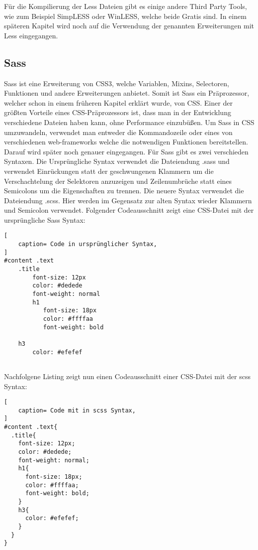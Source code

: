 Für die Kompilierung der Less Dateien gibt es einige andere Third Party Tools, wie zum Beispiel SimpLESS oder WinLESS, welche beide Gratis sind.\newline
In einem späteren Kapitel wird noch auf die Verwendung der genannten Erweiterungen mit Less eingegangen.
\newpage
\subsection{Sass}
Sass ist eine Erweiterung von CSS3, welche Variablen, Mixins, Selectoren, Funktionen und andere Erweiterungen anbietet. Somit ist Sass ein Präprozessor, welcher schon in einem früheren Kapitel erklärt wurde, von CSS.\newline
Einer der größten Vorteile eines CSS-Präprozessors ist, dass man in der Entwicklung verschiedene Dateien haben kann, ohne Performance einzubüßen.\newline
Um Sass in CSS umzuwandeln, verwendet man entweder die Kommandozeile oder eines von verschiedenen web-frameworks welche die notwendigen Funktionen bereitstellen. Darauf wird später noch genauer eingegangen.\newline
Für Sass gibt es zwei verschieden Syntaxen. Die Ursprüngliche Syntax verwendet die Dateiendung .sass und verwendet Einrückungen statt der geschwungenen Klammern um die Verschachtelung der Selektoren anzuzeigen und Zeilenumbrüche statt eines Semicolons um die Eigenschaften zu trennen.\newline
Die neuere Syntax verwendet die Dateiendung .scss. Hier werden im Gegensatz zur alten Syntax wieder Klammern und Semicolon verwendet.  \autocite[]{Yard.2014}\newline
Folgender Codeausschnitt zeigt eine CSS-Datei mit der ursprüngliche Sass Syntax:
\begin{lstlisting}[
	caption= Code in ursprünglicher Syntax,
]
#content .text
    .title
        font-size: 12px
        color: #dedede
        font-weight: normal
        h1
           font-size: 18px
           color: #ffffaa
           font-weight: bold
    
    h3
        color: #efefef
    
\end{lstlisting}

Nachfolgene Listing zeigt nun einen Codeausschnitt einer CSS-Datei mit der scss Syntax:
\begin{lstlisting}[
	caption= Code mit in scss Syntax,
]
#content .text{
  .title{
    font-size: 12px;
    color: #dedede;
    font-weight: normal;
    h1{
      font-size: 18px;
      color: #ffffaa;
      font-weight: bold;
    }
    h3{
      color: #efefef;
    }
  }
}
\end{lstlisting}

